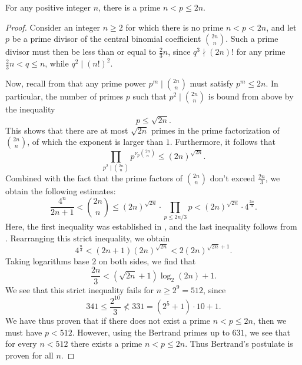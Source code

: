 \begin{theorem}
  For any positive integer $n$, there is a prime $n<p\leq 2n$.
\end{theorem}

\begin{proof}
  Consider an integer $n\geq 2$ for which there is no prime $n<p<2n$, and let $p$ be a prime divisor of the central binomial coefficient $\binom{2n}{n}$. Such a prime divisor must then be less than or equal to $\frac{2}{3}n$, since $q^3\nmid (2n)!$ for any prime $\frac{2}{3}n<q\leq n$, while $q^2\mid (n!)^2$.

  Now, recall from  that any prime power $p^m\mid\binom{2n}{n}$ must satisfy $p^m\leq 2n$. In particular, the number of primes $p$ such that $p^2\mid\binom{2n}{n}$ is bound from above by the inequality
  \begin{equation*}
    p\leq \sqrt{2n}.
  \end{equation*}
  This shows that there are at most $\sqrt{2n}$ primes in the prime factorization of $\binom{2n}{n}$, of which the exponent is larger than $1$. Furthermore, it follows that
  \begin{equation*}
    \prod_{p^2\mid\binom{2n}{n}}p^{\nu_p\binom{2n}{n}}\leq (2n)^{\sqrt{2n}}.
  \end{equation*}
  Combined with the fact that the prime factors of $\binom{2n}{n}$ don't exceed $\frac{2n}{3}$, we obtain the following estimates:
  \begin{equation*}
    \frac{4^n}{2n+1}<\binom{2n}{n}\leq (2n)^{\sqrt{2n}}\cdot \prod_{p\leq 2n/3}p< (2n)^{\sqrt{2n}} \cdot 4^{\frac{2n}{3}}.
  \end{equation*}
  Here, the first inequality was established in , and the last inequality follows from . Rearranging this strict inequality, we obtain
  \begin{equation*}
    4^{\frac{n}{3}}<(2n+1)(2n)^{\sqrt{2n}}<2(2n)^{\sqrt{2n}+1}.
  \end{equation*}
  Taking logarithms base $2$ on both sides, we find that
  \begin{equation*}
    \frac{2n}{3} < (\sqrt{2n}+1)\log_2(2n)+1.
  \end{equation*}
  We see that this strict inequality fails for $n\geq 2^9=512$, since
  \begin{equation*}
    341 \leq \frac{2^{10}}{3} \nless 331 = (2^5+1)\cdot 10 + 1.
  \end{equation*}
  We have thus proven that if there does not exist a prime $n<p\leq 2n$, then we must have $p<512$. However, using the Bertrand primes up to $631$, we see that for every $n<512$ there exists a prime $n<p\leq 2n$. Thus Bertrand's postulate is proven for all $n$.
\end{proof}

